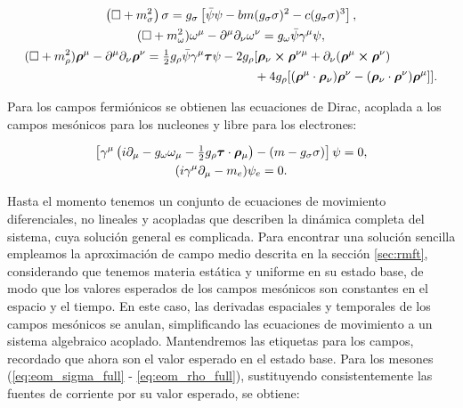 \begin{gather}
	\left(\square + m_\sigma^2\right) \sigma = g_\sigma\left[\bar{\psi} \psi - bm(g_\sigma\sigma)^2 - c(g_\sigma\sigma)^3\right], \label{eq:eom_sigma_full} \\
	(\square + m_\omega^2) \omega^\mu - \partial^\mu \partial_\nu \omega^\nu = g_{\omega} \bar{\psi} \gamma^\mu \psi, \label{eq:eom_omega_full} \\
	\begin{aligned}
		(\square + m_\rho^2) \boldsymbol{\rho}^\mu - \partial^\mu \partial_\nu \boldsymbol{\rho}^\nu = \tfrac{1}{2} g_{\rho} \bar{\psi} \gamma^\mu \boldsymbol{\tau} \psi - 2g_\rho&[\boldsymbol{\rho}_\nu \cross \boldsymbol{\rho}^{\nu\mu} + \partial_\nu(\boldsymbol{\rho}^\mu \cross \boldsymbol{\rho}^\nu) \\ 
		&+ 4g_\rho[(\boldsymbol{\rho}^\mu \cdot \boldsymbol{\rho}_\nu)\boldsymbol{\rho}^\nu - (\boldsymbol{\rho}_\nu \cdot \boldsymbol{\rho}^\nu)\boldsymbol{\rho}^\mu]]. \label{eq:eom_rho_full}
	\end{aligned}
\end{gather}

Para los campos fermiónicos se obtienen las ecuaciones de Dirac, acoplada a los campos mesónicos para los nucleones y libre para los electrones:

\begin{gather*}
	\left[ \gamma^\mu \left( i\partial_\mu - g_{\omega} \omega_\mu - \tfrac{1}{2} g_{\rho} \boldsymbol{\tau} \cdot \boldsymbol{\rho}_\mu \right) - (m - g_{\sigma} \sigma) \right] \psi = 0, \\
	(i\gamma^\mu \partial_\mu - m_e) \psi_e = 0.
\end{gather*}

Hasta el momento tenemos un conjunto de ecuaciones de movimiento diferenciales, no lineales y acopladas que describen la dinámica completa del sistema, cuya solución general es complicada. Para encontrar una solución sencilla empleamos la aproximación de campo medio descrita en la sección \ref{sec:rmft}, considerando que tenemos materia estática y uniforme en su estado base, de modo que los valores esperados de los campos mesónicos son constantes en el espacio y el tiempo. En este caso, las derivadas espaciales y temporales de los campos mesónicos se anulan, simplificando las ecuaciones de movimiento a un sistema algebraico acoplado. Mantendremos las etiquetas para los campos, recordado que ahora son el valor esperado en el estado base. Para los mesones (\ref{eq:eom_sigma_full} - \ref{eq:eom_rho_full}), sustituyendo consistentemente las fuentes de corriente por su valor esperado, se obtiene:


